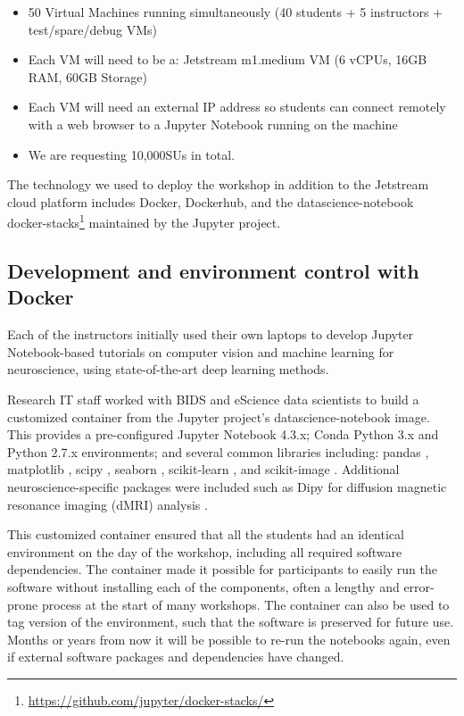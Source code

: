 \begin{itemize}
\item 50 Virtual Machines running simultaneously (40 students + 5 instructors +
test/spare/debug VMs)
\item Each VM will need to be a: Jetstream m1.medium VM (6 vCPUs, 16GB RAM, 60GB
  Storage)
\item Each VM will need an external IP address so students can connect remotely
  with a web browser to a Jupyter Notebook running on the machine
\item We are requesting 10,000SUs in total.
\end{itemize}

The technology we used to deploy the workshop in addition to the Jetstream cloud
platform includes Docker, Dockerhub, and the datascience-notebook docker-stacks\footnote{\url{https://github.com/jupyter/docker-stacks/}}
maintained by the Jupyter project.

\subsection{Development and environment control with Docker}

Each of the instructors initially used their own laptops to develop Jupyter
Notebook-based tutorials on computer vision and machine learning for
neuroscience, using state-of-the-art deep learning methods.

Research IT staff worked with BIDS and eScience data scientists to build a
customized container from the Jupyter project's datascience-notebook image. This
provides a pre-configured Jupyter Notebook 4.3.x; Conda Python 3.x and Python
2.7.x environments; and several common libraries including: pandas
\cite{mckinney-proc-scipy-2010}, matplotlib \cite{hunter2007matplotlib}, scipy
\cite{scipy}, seaborn \cite{michael_waskom_2014_12710}, scikit-learn
\cite{Pedregosa2012-dm}, and scikit-image \cite{van2014scikit}. Additional
neuroscience-specific packages were included such as Dipy for diffusion magnetic
resonance imaging (dMRI) analysis \cite{Garyfallidis2014FrontNeuroinf}.

This customized container ensured that all the students had an identical
environment on the day of the workshop, including all required software
dependencies. The container made it possible for participants to easily run the
software without installing each of the components, often a lengthy and
error-prone process at the start of many workshops. The container can also be
used to tag version of the environment, such that the software is preserved
for future use. Months or years from now it will be possible to re-run the
notebooks again, even if external software packages and dependencies have
changed.

